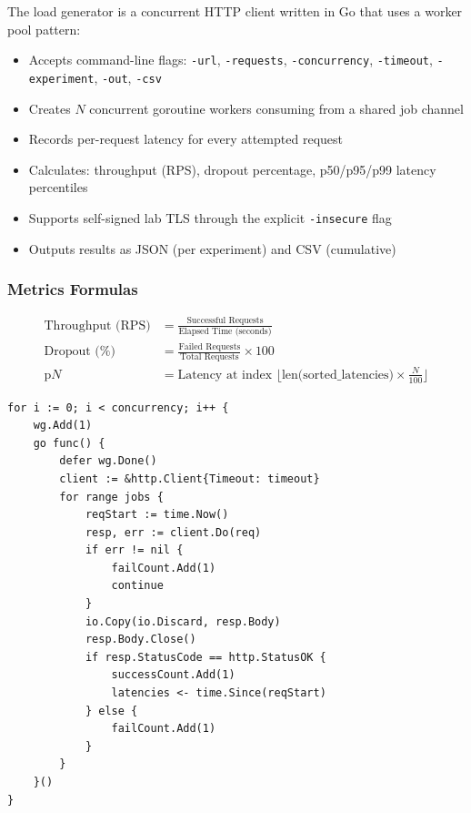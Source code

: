 \documentclass[12pt,a4paper]{article}
\begin{document}
The load generator is a concurrent HTTP client written in Go that uses a worker pool pattern:

\begin{itemize}[leftmargin=2em]
    \item Accepts command-line flags: \texttt{-url}, \texttt{-requests}, \texttt{-concurrency}, \texttt{-timeout}, \texttt{-experiment}, \texttt{-out}, \texttt{-csv}
    \item Creates $N$ concurrent goroutine workers consuming from a shared job channel
    \item Records per-request latency for every attempted request
    \item Calculates: throughput (RPS), dropout percentage, p50/p95/p99 latency percentiles
    \item Supports self-signed lab TLS through the explicit \texttt{-insecure} flag
    \item Outputs results as JSON (per experiment) and CSV (cumulative)
\end{itemize}

\subsubsection{Metrics Formulas}

\begin{align}
\text{Throughput (RPS)} &= \frac{\text{Successful Requests}}{\text{Elapsed Time (seconds)}} \\[8pt]
\text{Dropout (\%)} &= \frac{\text{Failed Requests}}{\text{Total Requests}} \times 100 \\[8pt]
\text{p}N &= \text{Latency at index } \lfloor \text{len(sorted\_latencies)} \times \frac{N}{100} \rfloor
\end{align}

\begin{lstlisting}[style=gostyle, caption={Worker pool pattern in the load generator}]
for i := 0; i < concurrency; i++ {
    wg.Add(1)
    go func() {
        defer wg.Done()
        client := &http.Client{Timeout: timeout}
        for range jobs {
            reqStart := time.Now()
            resp, err := client.Do(req)
            if err != nil {
                failCount.Add(1)
                continue
            }
            io.Copy(io.Discard, resp.Body)
            resp.Body.Close()
            if resp.StatusCode == http.StatusOK {
                successCount.Add(1)
                latencies <- time.Since(reqStart)
            } else {
                failCount.Add(1)
            }
        }
    }()
}
\end{lstlisting}
\end{document}
